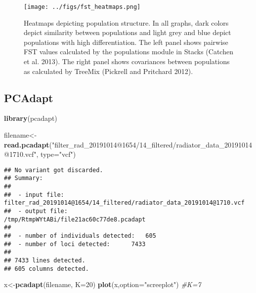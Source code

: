 \documentclass[11pt,]{article}
\newenvironment{Shaded}{\begin{snugshade}}{\end{snugshade}}
\newcommand{\KeywordTok}[1]{\textcolor[rgb]{0.13,0.29,0.53}{\textbf{#1}}}
\newcommand{\DataTypeTok}[1]{\textcolor[rgb]{0.13,0.29,0.53}{#1}}
\newcommand{\DecValTok}[1]{\textcolor[rgb]{0.00,0.00,0.81}{#1}}
\newcommand{\StringTok}[1]{\textcolor[rgb]{0.31,0.60,0.02}{#1}}
\newcommand{\CommentTok}[1]{\textcolor[rgb]{0.56,0.35,0.01}{\textit{#1}}}
\newcommand{\NormalTok}[1]{#1}
\begin{document}
\begin{figure}
\centering
\texttt{[image: ../figs/fst\_heatmaps.png]}
\caption{Heatmaps depicting population structure. In all graphs, dark
colors depict similarity between populations and light grey and blue
depict populations with high differentiation. The left panel shows
pairwise FST values calculated by the populations module in Stacks
(Catchen et al. 2013). The right panel shows covariances between
populations as calculated by TreeMix (Pickrell and Pritchard 2012).}
\end{figure}

\subsection*{PCAdapt}\label{pcadapt}

\begin{Shaded}
\begin{Highlighting}[]
\KeywordTok{library}\NormalTok{(pcadapt)}
\end{Highlighting}
\end{Shaded}

\begin{Shaded}
\begin{Highlighting}[]
\NormalTok{filename<-}\KeywordTok{read.pcadapt}\NormalTok{(}\StringTok{"filter_rad_20191014@1654/14_filtered/radiator_data_20191014@1710.vcf"}\NormalTok{,}
                       \DataTypeTok{type=}\StringTok{"vcf"}\NormalTok{)}
\end{Highlighting}
\end{Shaded}

\begin{verbatim}
## No variant got discarded.
## Summary:
## 
##  - input file:               filter_rad_20191014@1654/14_filtered/radiator_data_20191014@1710.vcf
##  - output file:              /tmp/RtmpWYtABi/file21ac60c77de8.pcadapt
## 
##  - number of individuals detected:   605
##  - number of loci detected:      7433
## 
## 7433 lines detected.
## 605 columns detected.
\end{verbatim}

\begin{Shaded}
\begin{Highlighting}[]
\NormalTok{x<-}\KeywordTok{pcadapt}\NormalTok{(filename, }\DataTypeTok{K=}\DecValTok{20}\NormalTok{)}
\KeywordTok{plot}\NormalTok{(x,}\DataTypeTok{option=}\StringTok{"screeplot"}\NormalTok{) }\CommentTok{#K=7}
\end{Highlighting}
\end{Shaded}
\end{document}
